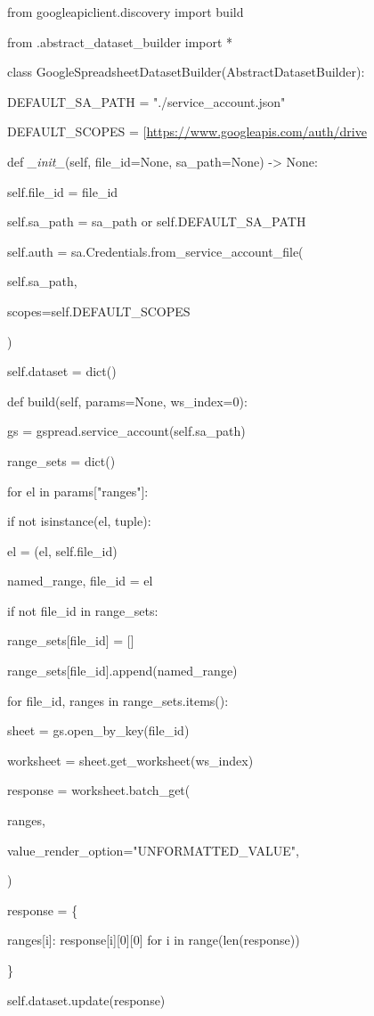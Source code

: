 \documentclass[
]{article}
\begin{document}
from googleapiclient.discovery import build

from .abstract\_dataset\_builder import *

class GoogleSpreadsheetDatasetBuilder(AbstractDatasetBuilder):

DEFAULT\_SA\_PATH = "./service\_account.json"

DEFAULT\_SCOPES =
{[}\textquotesingle{}\url{https://www.googleapis.com/auth/drive}\textquotesingle{]}

def \emph{\_init\_}(self, file\_id=None, sa\_path=None) -\textgreater{}
None:

self.file\_id = file\_id

self.sa\_path = sa\_path or self.DEFAULT\_SA\_PATH

self.auth = sa.Credentials.from\_service\_account\_file(

self.sa\_path,

scopes=self.DEFAULT\_SCOPES

)

self.dataset = dict()

def build(self, params=None, ws\_index=0):

gs = gspread.service\_account(self.sa\_path)

range\_sets = dict()

for el in params{[}"ranges"{]}:

if not isinstance(el, tuple):

el = (el, self.file\_id)

named\_range, file\_id = el

if not file\_id in range\_sets:

range\_sets{[}file\_id{]} = {[}{]}

range\_sets{[}file\_id{]}.append(named\_range)

for file\_id, ranges in range\_sets.items():

sheet = gs.open\_by\_key(file\_id)

worksheet = sheet.get\_worksheet(ws\_index)

response = worksheet.batch\_get(

ranges,

value\_render\_option="UNFORMATTED\_VALUE",

)

response = \{

ranges{[}i{]}: response{[}i{]}{[}0{]}{[}0{]} for i in
range(len(response))

\}

self.dataset.update(response)
\end{document}
